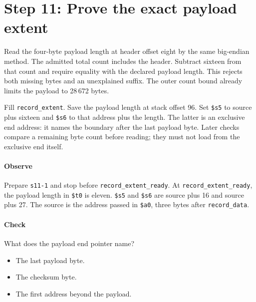 \section{Step 11: Prove the exact payload extent}
Read the four-byte payload length at header offset eight by the same
big-endian method. The admitted total count includes the header. Subtract sixteen
from that count and require equality with the declared payload length. This
rejects both missing bytes and an unexplained suffix. The outer count bound
already limits the payload to 28\,672 bytes.

Fill \texttt{record\_extent}. Save the payload length at stack offset 96. Set
\texttt{\$s5} to source plus sixteen and \texttt{\$s6} to that address plus the
length. The latter is an exclusive end address: it names the boundary after the
last payload byte. Later checks compare a remaining byte count before reading;
they must not load from the exclusive end itself.

\paragraph{Observe} Prepare \texttt{s11-1} and stop before
\texttt{record\_extent\_ready}. At \texttt{record\_extent\_ready}, the payload length in
\texttt{\$t0} is eleven. \texttt{\$s5} and \texttt{\$s6} are source plus
16 and source plus 27. The source is the address passed in \texttt{\$a0},
three bytes after \texttt{record\_data}.

\paragraph{Check} What does the payload end pointer name?
\begin{itemize}
  \item[A.] The last payload byte.
  \item[B.] The checksum byte.
  \item[C.] The first address beyond the payload.
\end{itemize}
